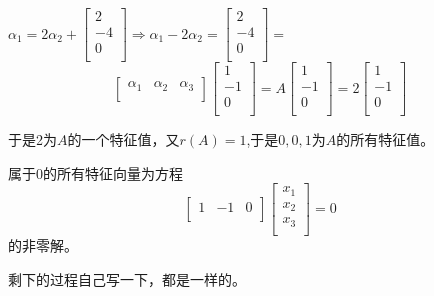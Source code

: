 \documentclass[lang=cn,10pt]{elegantbook}
\begin{document}
\begin{solution}
	
	$\alpha _1=2\alpha _2+\left[ \begin{array}{c}
		2\\
		-4\\
		0\\
	\end{array} \right]\Rightarrow\alpha _1-2\alpha _2=\left[ \begin{array}{c}
	2\\
	-4\\
	0\\
	\end{array} \right]=$
	\begin{equation*}
		\left[ \begin{matrix}
			\alpha _1&		\alpha _2&		\alpha _3\\
		\end{matrix} \right] \left[ \begin{array}{c}
			1\\
			-1\\
			0\\
		\end{array} \right] =A\left[ \begin{array}{c}
			1\\
			-1\\
			0\\
		\end{array} \right] =2\left[ \begin{array}{c}
			1\\
			-1\\
			0\\
		\end{array} \right] 
	\end{equation*}
	
	于是2为$A$的一个特征值，又$r(A)=1$,于是$0,0,1$为$A$的所有特征值。
	
	属于0的所有特征向量为方程
		\begin{equation*}
			\begin{bmatrix}
				1& -1 & 0\\
			\end{bmatrix}\left[ \begin{array}{c}
				x_1\\
				x_2\\
				x_3\\
			\end{array} \right]=0
		\end{equation*}
		的非零解。
		
		剩下的过程自己写一下，都是一样的。
\end{solution}
\end{document}
